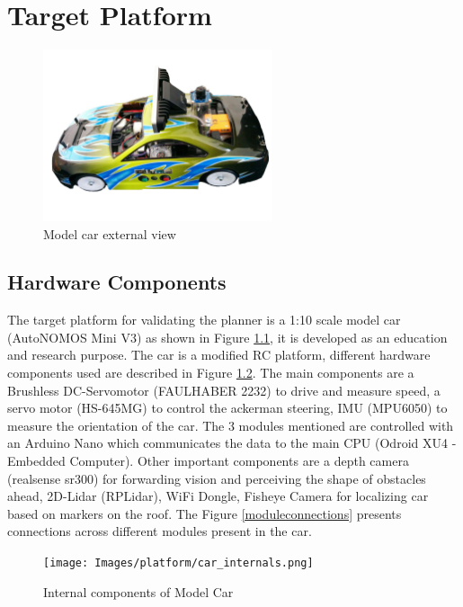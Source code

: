 \chapter{Target Platform}
\label{vehicle_info}

\begin{figure}[H]
	\centering
	\includegraphics[width=0.6\textwidth]{Images/platform/car.jpg}
	\caption{Model car external view}
	\label{model_car}
\end{figure}

\section{Hardware Components}
The target platform for validating the planner is a 1:10 scale model car (AutoNOMOS Mini V3) as shown in Figure \ref{model_car}, it is developed as an education and research purpose. The car is a modified RC platform, different hardware components used are described in Figure \ref{internalcar}. The main components are a Brushless DC-Servomotor (FAULHABER 2232) to drive and measure speed, a servo motor (HS-645MG) to control the ackerman steering, IMU (MPU6050) to measure the orientation of the car. The 3 modules mentioned are controlled with an Arduino Nano which communicates the data to the main CPU (Odroid XU4 - Embedded Computer). Other important components are a depth camera (realsense sr300) for forwarding vision and perceiving the shape of obstacles ahead, 2D-Lidar (RPLidar), WiFi Dongle, Fisheye Camera for localizing car based on markers on the roof. The Figure \ref{moduleconnections} presents connections across different modules present in the car.
\begin{figure}
	\centering
	\texttt{[image: Images/platform/car\_internals.png]}
	\caption{Internal components of Model Car}
	\label{internalcar}
\end{figure}

